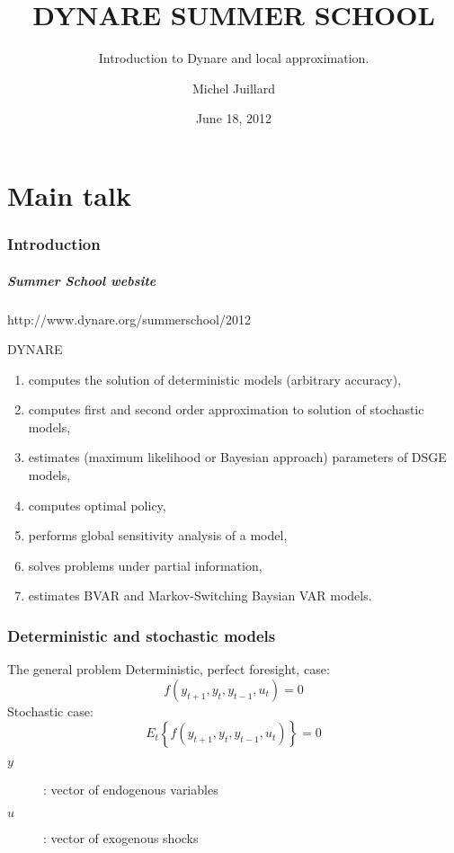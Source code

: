 \documentclass{beamer}
\title{DYNARE SUMMER SCHOOL}
\subtitle{Introduction to Dynare and local approximation.}
\date{June 18, 2012}
\author{Michel Juillard}
\begin{document}
\begin{frame}
  \titlepage
\end{frame}

\part<presentation>{Main talk}
\section[introduction]{Introduction}
  \begin{frame}
    \frametitle{Summer School website}
    \begin{center}
      http://www.dynare.org/summerschool/2012
    \end{center}
  \end{frame}



\begin{slide}{DYNARE}
  \begin{enumerate}
  \item computes the solution of deterministic models (arbitrary accuracy),
  \item computes first and second order approximation to solution of stochastic models,
  \item estimates (maximum likelihood or Bayesian approach) parameters of DSGE models,
  \item computes optimal policy,
  \item performs global sensitivity analysis of a model,
  \item solves problems under partial information,
  \item estimates BVAR and Markov-Switching Baysian VAR models.
  \end{enumerate}
\end{slide}

\section[Deterministic models]{Deterministic and stochastic models}
\begin{slide}{The general problem}
Deterministic, perfect foresight, case:
\[
f(y_{t+1},y_t,y_{t-1},u_t)=0
\]
Stochastic case:
\[
E_t\left\{f(y_{t+1},y_t,y_{t-1},u_t)\right\}=0
\]
\begin{description}
  \item[$y$]: vector of endogenous variables
  \item[$u$]: vector of exogenous shocks
\end{description}
\end{slide}
\end{document}
